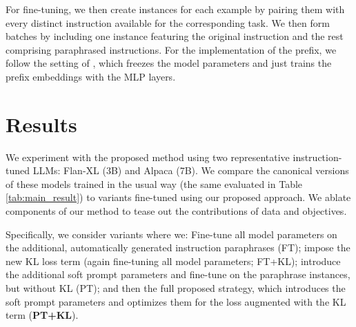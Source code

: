 For fine-tuning, we then create instances for each example by pairing them with every distinct instruction available for the corresponding task.
We then form batches by including one instance featuring the original instruction and the rest comprising paraphrased instructions. For the implementation of the prefix, we follow the setting of \cite{li2021prefix}, which freezes the model parameters and just trains the prefix embeddings with the MLP layers.


\section{Results}

We experiment with the proposed method using two representative instruction-tuned LLMs: Flan-XL (3B) and Alpaca (7B).
We compare the canonical versions of these models trained in the usual way (the same evaluated in Table \ref{tab:main_result}) to variants fine-tuned using our proposed approach.
We ablate components of our method to tease out the contributions of data and objectives.

Specifically, we consider variants where we: Fine-tune all model parameters on the additional, automatically generated instruction paraphrases (FT); impose the new KL loss term (again fine-tuning all model parameters; FT+KL); introduce the additional soft prompt parameters and fine-tune on the paraphrase instances, but without KL (PT); and then the full proposed strategy, which introduces the soft prompt parameters and optimizes them for the loss augmented with the KL term ({\bf PT+KL}).


